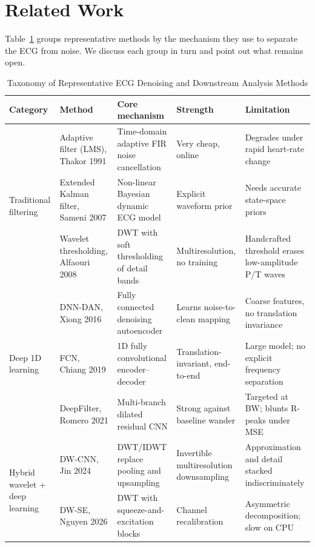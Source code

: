 \section{Related Work}
\label{sec:related}

Table~\ref{tab:taxonomic_comparison} groups representative methods by the mechanism they use to separate the ECG from noise. We discuss each group in turn and point out what remains open.

\begin{table}[!t]
\caption{Taxonomy of Representative ECG Denoising and Downstream Analysis Methods}
\label{tab:taxonomic_comparison}
\centering
\footnotesize
\renewcommand{\arraystretch}{1.2}
\begin{tabular}{@{}p{2.0cm}p{3.1cm}p{3.9cm}p{3.3cm}p{4.0cm}@{}}
\toprule
\textbf{Category} & \textbf{Method} & \textbf{Core mechanism} & \textbf{Strength} & \textbf{Limitation} \\
\midrule
\multirow{3}{2.0cm}{Traditional filtering}
& Adaptive filter (LMS), Thakor 1991 \cite{clifford2006} & Time-domain adaptive FIR noise cancellation & Very cheap, online & Degrades under rapid heart-rate change \\
& Extended Kalman filter, Sameni 2007 \cite{clifford2006} & Non-linear Bayesian dynamic ECG model & Explicit waveform prior & Needs accurate state-space priors \\
& Wavelet thresholding, Alfaouri 2008 \cite{clifford2006} & DWT with soft thresholding of detail bands & Multiresolution, no training & Handcrafted threshold erases low-amplitude P/T waves \\
\midrule
\multirow{3}{2.0cm}{Deep 1D learning}
& DNN-DAN, Xiong 2016 \cite{xiong2016} & Fully connected denoising autoencoder & Learns noise-to-clean mapping & Coarse features, no translation invariance \\
& FCN, Chiang 2019 \cite{chiang2019} & 1D fully convolutional encoder--decoder & Translation-invariant, end-to-end & Large model; no explicit frequency separation \\
& DeepFilter, Romero 2021 \cite{romero2021} & Multi-branch dilated residual CNN & Strong against baseline wander & Targeted at BW; blunts R-peaks under MSE \\
\midrule
\multirow{4}{2.0cm}{Hybrid wavelet + deep learning}
& DW-CNN, Jin 2024 \cite{jin2024} & DWT/IDWT replace pooling and upsampling & Invertible multiresolution downsampling & Approximation and detail stacked indiscriminately \\
& DW-SE, Nguyen 2026 \cite{nguyen2026dwse} & DWT with squeeze-and-excitation blocks & Channel recalibration & Asymmetric decomposition; slow on CPU \\

\end{tabular}
\end{table}
